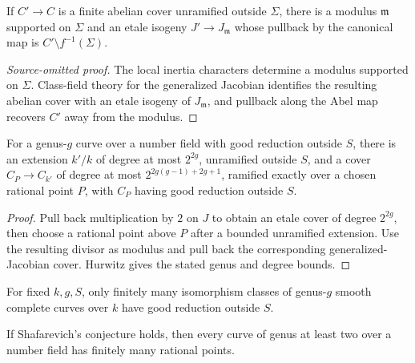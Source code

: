 \begin{proposition}
\label{prop:milne-generalized-jacobian-coverings-source}

If $C'\to C$ is a finite abelian cover unramified outside $\Sigma$, there is
a modulus $\mathfrak m$ supported on $\Sigma$ and an etale isogeny
$J'\to J_{\mathfrak m}$ whose pullback by the canonical map is
$C'\setminus f^{-1}(\Sigma)$.
\end{proposition}
\begin{proof}[Source-omitted proof]
The local inertia characters determine a modulus supported on $\Sigma$.
Class-field theory for the generalized Jacobian identifies the resulting
abelian cover with an etale isogeny of $J_{\mathfrak m}$, and pullback along
the Abel map recovers $C'$ away from the modulus.
\end{proof}

\begin{proposition}
\label{prop:milne-parshin-auxiliary-cover-source}

For a genus-$g$ curve over a number field with good reduction outside $S$,
there is an extension $k'/k$ of degree at most $2^{2g}$, unramified outside
$S$, and a cover $C_P\to C_{k'}$ of degree at most
$2^{2g(g-1)+2g+1}$, ramified exactly over a chosen rational point $P$,
with $C_P$ having good reduction outside $S$.
\end{proposition}

\begin{proof}

Pull back multiplication by $2$ on $J$ to obtain an etale cover of degree
$2^{2g}$, then choose a rational point above $P$ after a bounded unramified
extension.  Use the resulting divisor as modulus and pull back the corresponding
generalized-Jacobian cover.  Hurwitz gives the stated genus and degree bounds.

\end{proof}


\begin{conjecture}[Shafarevich]
\label{conj:milne-shafarevich-source}

\notready
For fixed $k,g,S$, only finitely many isomorphism classes of genus-$g$ smooth
complete curves over $k$ have good reduction outside $S$.
\end{conjecture}

\begin{theorem}
\label{thm:milne-shafarevich-implies-mordell-source}

If Shafarevich's conjecture holds, then every curve of genus at least two over
a number field has finitely many rational points.
\end{theorem}

